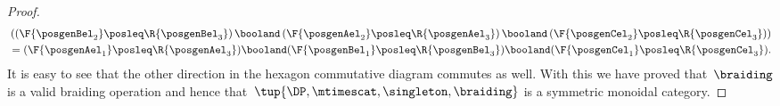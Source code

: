 \begin{proof}
\begin{equation}
\begin{aligned}
            & \left(\left(\F{\posgenBel_2}\posleq \R{\posgenBel_3}\right)\booland \left(\F{\posgenAel_2}\posleq \R{\posgenAel_3}\right) \booland \left(\F{\posgenCel_2}\posleq \R{\posgenCel_3}\right)\right)\\
            &=(\F{\posgenAel_1}\posleq \R{\posgenAel_3}) \booland (\F{\posgenBel_1}\posleq \R{\posgenBel_3}) \booland (\F{\posgenCel_1}\posleq \R{\posgenCel_3}).
        \end{aligned}
    \end{equation}
    It is easy to see that the other direction in the hexagon commutative diagram commutes as well.
    With this we have proved that~$\braiding$ is a valid braiding operation and hence that~$\tup{\DP, \mtimescat, \singleton, \braiding}$ is a symmetric monoidal category.
\end{proof}
